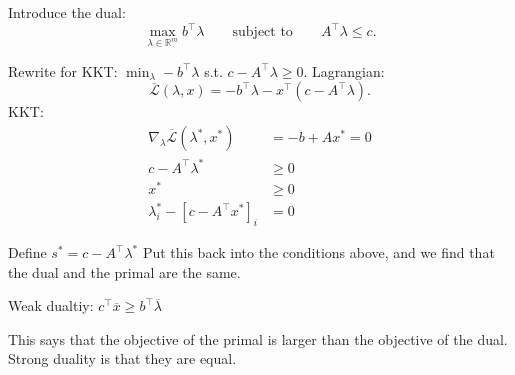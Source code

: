 \documentclass{article}
\begin{document}
Introduce the dual:
\[
  \max_{\lambda \in\mathbb{R}^{m}} b^{\top}\lambda \qquad \text{subject to} \qquad A^{\top}\lambda \leq c
.\] 

Rewrite for KKT: $\min_{\lambda} - b^{\top}\lambda$ s.t. $c-A^{\top}\lambda \geq 0$. Lagrangian:
\[
  \overline{\mathcal{L}}(\lambda, x) = -b^{\top}\lambda - x^{\top}(c-A^{\top}\lambda)
.\] 
KKT:
\begin{align*}
  \nabla_{\lambda} \overline{\mathcal{L}}(\lambda^*, x^*) &= -b + Ax^* = 0 \\
  c - A^{\top}\lambda^* &\geq 0 \\
  x^* &\geq 0 \\
  \lambda_i ^*-[c - A^{\top}x^*]_i &= 0
\end{align*}

Define $s^* = c - A^{\top}\lambda^*$ Put this back into the conditions above, and we find that the dual and the primal are the same. 

Weak dualtiy: $c^{\top} \overline{x} \geq b^{\top} \overline{\lambda}$

\medskip This says that the objective of the primal is larger than the objective of the dual. 
Strong duality is that they are equal. 
\end{document}
